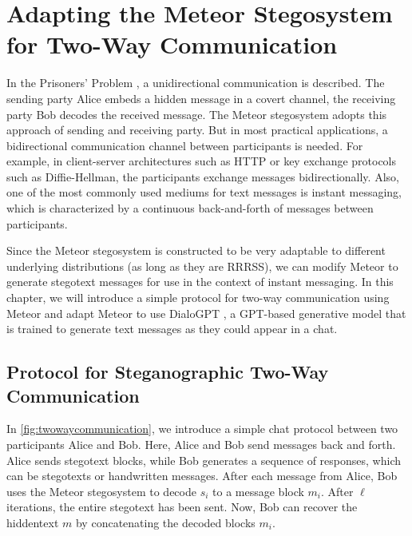 \chapter{Adapting the Meteor Stegosystem for Two-Way Communication}
\label{chap:twowaycommunication}


In the Prisoners' Problem \cite{Simmons1983}, a unidirectional communication is described.
The sending party Alice embeds a hidden message in a covert channel, the receiving party Bob decodes the received message.
The Meteor stegosystem adopts this approach of sending and receiving party.
But in most practical applications, a bidirectional communication channel between participants is needed.
For example, in client-server architectures such as HTTP or key exchange protocols such as Diffie-Hellman, the participants exchange messages bidirectionally.
Also, one of the most commonly used mediums for text messages is instant messaging, which is characterized by a continuous back-and-forth of messages between participants.

Since the Meteor stegosystem is constructed to be very adaptable to different underlying distributions (as long as they are RRRSS), we can modify Meteor to generate stegotext messages for use in the context of instant messaging.
In this chapter, we will introduce a simple protocol for two-way communication using Meteor and adapt Meteor to use DialoGPT \cite{Zhang2020}, a GPT-based generative model that is trained to generate text messages as they could appear in a chat.

\section{Protocol for Steganographic Two-Way Communication}

In \autoref{fig:twowaycommunication}, we introduce a simple chat protocol between two participants Alice and Bob.
Here, Alice and Bob send messages back and forth.
Alice sends stegotext blocks, while Bob generates a sequence of responses, which can be stegotexts or handwritten messages.
After each message from Alice, Bob uses the Meteor stegosystem to decode $s_i$ to a message block $m_i$.
After $\ell$ iterations, the entire stegotext has been sent.
Now, Bob can recover the hiddentext $m$ by concatenating the decoded blocks $m_i$.


